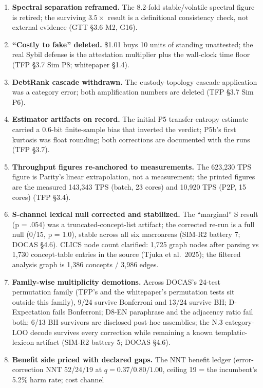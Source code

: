 \documentclass[
]{article}
\begin{document}
\begin{enumerate}
  GTT §3.4; TFP §3.6 Sim P1c).
\item
  \textbf{Spectral separation reframed.} The 8.2-fold stable/volatile
  spectral figure is retired; the surviving \(3.5\times\) result is a
  definitional consistency check, not external evidence (GTT §3.6 M2,
  G16).
\item
  \textbf{``Costly to fake'' deleted.} \$1.01 buys 10 units of standing
  unattested; the real Sybil defense is the attestation multiplier plus
  the wall-clock time floor (TFP §3.7 Sim P8; whitepaper §1.4).
\item
  \textbf{DebtRank cascade withdrawn.} The custody-topology cascade
  application was a category error; both amplification numbers are
  deleted (TFP §3.7 Sim P6).
\item
  \textbf{Estimator artifacts on record.} The initial P5
  transfer-entropy estimate carried a 0.6-bit finite-sample bias that
  inverted the verdict; P5b's first kurtosis was float rounding; both
  corrections are documented with the runs (TFP §3.7).
\item
  \textbf{Throughput figures re-anchored to measurements.} The 623,230
  TPS figure is Parity's linear extrapolation, not a measurement; the
  printed figures are the measured 143,343 TPS (batch, 23 cores) and
  10,920 TPS (P2P, 15 cores) (TFP §3.4).
\item
  \textbf{S-channel lexical null corrected and stabilized.} The
  ``marginal'' S result (p = .054) was a truncated-concept-list
  artifact; the corrected re-run is a full null (0/15, p = 1.0), stable
  across all six macroareas (SIM-R2 battery 7; DOCAS §4.6). CLICS node
  count clarified: 1,725 graph nodes after parsing vs 1,730
  concept-table entries in the source (Tjuka et al.~2025); the filtered
  analysis graph is 1,386 concepts / 3,986 edges.
\item
  \textbf{Family-wise multiplicity demotions.} Across DOCAS's 24-test
  permutation family (TFP's and the whitepaper's permutation tests sit
  outside this family), 9/24 survive Bonferroni and 13/24 survive BH;
  D-Expectation fails Bonferroni; D8-EN paraphrase and the adjacency
  ratio fail both; 6/13 BH survivors are disclosed post-hoc assemblies;
  the N.3 category-LOO decode survives every correction while remaining
  a known templatic-lexicon artifact (SIM-R2 battery 5; DOCAS §4.6).
\item
  \textbf{Benefit side priced with declared gaps.} The NNT benefit
  ledger (error-correction NNT 52/24/19 at \(q = 0.37/0.80/1.00\),
  ceiling 19 = the incumbent's 5.2\% harm rate; cost channel

\end{enumerate}
\end{document}

